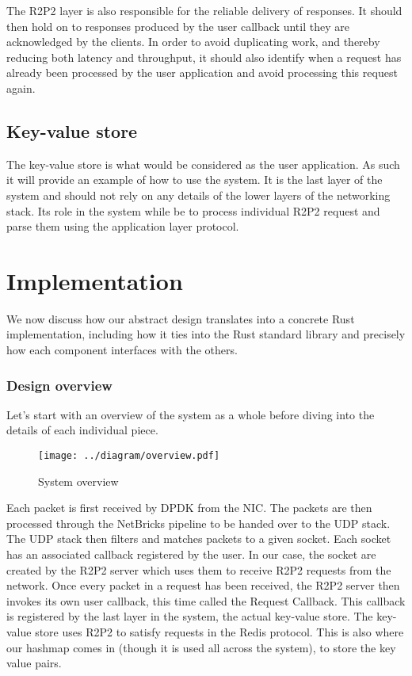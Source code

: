 \documentclass[11pt]{book}
\begin{document}
The R2P2 layer is also responsible for the reliable delivery of
responses. It should then hold on to responses produced by the user
callback until they are acknowledged by the clients. In order to avoid
duplicating work, and thereby reducing both latency and throughput,
it should also identify when a request has already been processed by
the user application and avoid processing this request again.

\section{Key-value store}

The key-value store is what would be considered as the user
application. As such it will provide an example of how to use the
system. It is the last layer of the system and should not rely on any
details of the lower layers of the networking stack. Its role in the
system while be to process individual R2P2 request and parse them
using the application layer protocol.

\chapter{Implementation}

We now discuss how our abstract design translates into a concrete Rust
implementation, including how it ties into the Rust standard library
and precisely how each component interfaces with the others.

\subsection{Design overview}

Let's start with an overview of the system as a whole before diving
into the details of each individual piece.

\begin{figure}[htb!]
  \texttt{[image: ../diagram/overview.pdf]}
  \caption{System overview}
  \label{fig:design-overview}
\end{figure}

Each packet is first received by DPDK from the NIC\@. The packets are
then processed through the NetBricks pipeline to be handed over to the
UDP stack. The UDP stack then filters and matches packets to a given
socket. Each socket has an associated callback registered by the
user. In our case, the socket are created by the R2P2 server which
uses them to receive R2P2 requests from the network. Once every packet
in a request has been received, the R2P2 server then invokes its own
user callback, this time called the Request Callback. This callback
is registered by the last layer in the system, the actual key-value
store. The key-value store uses R2P2 to satisfy requests in the Redis
protocol. This is also where our hashmap comes in (though it is used
all across the system), to store the key value pairs.
\end{document}
